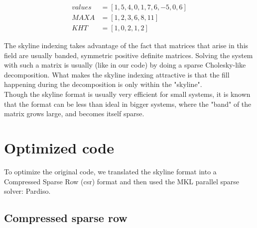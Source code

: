 \documentclass[11pt]{article}
\begin{document}
\begin{align}
values&=[1, 5, 4, 0, 1, 7, 6, -5, 0, 6]\\
MAXA&= [1, 2, 3, 6, 8, 11] \\
KHT&=[1, 0, 2, 1, 2]
\end{align}

 The skyline indexing takes advantage of the fact that matrices that arise in this field are usually banded, symmetric positive definite matrices. Solving the system with such a matrix is usually (like in our code) by doing a sparse Cholesky-like decomposition. What makes the skyline indexing attractive is that the fill happening during the decomposition is only within the "skyline".\\
 
Though the skyline format is usually very efficient for small systems, it is known that the format can be less than ideal in bigger systems, where the "band" of the matrix grows large, and becomes itself  sparse.

\section{Optimized code}\label{sec:newCode}
To optimize the original code, we translated the skyline format into a Compressed Sparse Row (csr) format and then used the MKL parallel sparse solver: Pardiso.

\subsection{Compressed sparse row}
\end{document}
